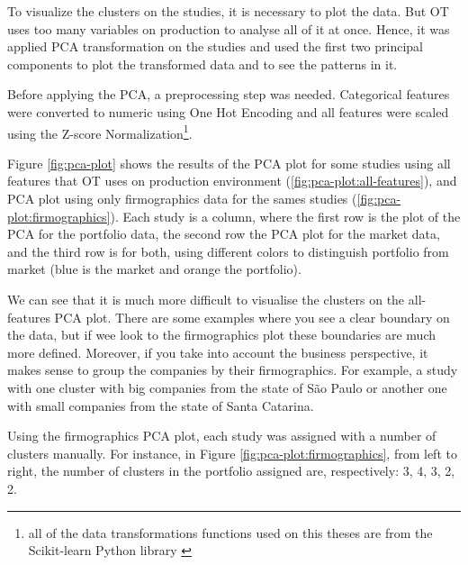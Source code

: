 To visualize the clusters on the studies, it is necessary to plot the data. But OT uses too many variables on production to analyse all of it at once. Hence, it was applied PCA transformation on the studies and used the first two principal components to plot the transformed data and to see the patterns in it. 

Before applying the PCA, a preprocessing step was needed. Categorical features were converted to numeric using One Hot Encoding and all features were scaled using the Z-score Normalization\footnote{all of the data transformations functions used on this theses are from the Scikit-learn Python library \cite{scikit-learn}}.

Figure \ref{fig:pca-plot} shows the results of the PCA plot for some studies using all features that OT uses on production environment (\ref{fig:pca-plot:all-features}), and PCA plot using only firmographics data for the sames studies (\ref{fig:pca-plot:firmographics}). Each study is a column, where the first row is the plot of the PCA for the portfolio data, the second row the PCA plot for the market data, and the third row is for both, using different colors to distinguish portfolio from market (blue is the market and orange the portfolio).

We can see that it is much more difficult to visualise the clusters on the all-features PCA plot. There are some examples where you see a clear boundary on the data, but if wee look to the firmographics plot these boundaries are much more defined. Moreover, if you take into account the business perspective, it makes sense to group the companies by their firmographics. For example, a study with one cluster with big companies from the state of São Paulo or another one with small companies from the state of Santa Catarina.

Using the firmographics PCA plot, each study was assigned with a number of clusters manually. For instance, in Figure \ref{fig:pca-plot:firmographics}, from left to right, the number of clusters in the portfolio assigned are, respectively: 3, 4, 3, 2, 2.  

